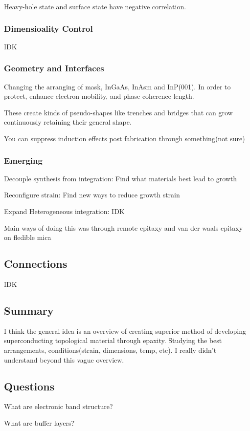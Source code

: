 Heavy-hole state and surface state have negative correlation.

\subsubsection{Dimensioality Control}
IDK
\subsubsection{Geometry and Interfaces}
Changing the arranging of mask, InGaAs, InAsm and InP(001). In order to protect, enhance electron mobility, and phase coherence length.

These create kinds of pseudo-shapes like trenches and bridges that can grow continuously retaining their general shape.

You can suppress induction effects post fabrication through something(not sure)

\subsubsection{Emerging}
Decouple synthesis from integration: Find what materials best lead to growth

Reconfigure strain: Find new ways to reduce growth strain

Expand Heterogeneous integration: IDK

Main ways of doing this was through remote epitaxy and van der waals epitaxy on fledible mica
\subsection{Connections}
IDK

\subsection{Summary}
I think the general idea is an overview of creating superior method of developing superconducting topological material through epaxity. Studying the best arrangements, conditions(strain, dimensions, temp, etc). I really didn't understand beyond this vague overview.


\subsection{Questions}

What are electronic band structure?

What are buffer layers?

